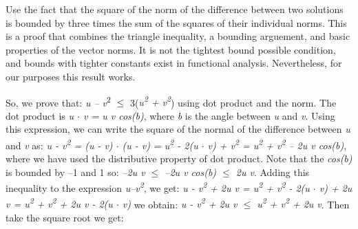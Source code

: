 \documentclass[12pt,a4paper]{report}
\numberwithin{equation}{section}
\begin{document}
Use the fact that the square of the norm of the difference between two
solutions is bounded by three times the sum of the squares of their
individual norms. This is a proof that combines the triangle inequality,
a bounding arguement, and basic properties of the vector norms. It is
not the tightest bound possible condition, and bounds with tighter
constants exist in functional analysis. Nevertheless, for our purposes
this result works.

So, we prove that: \textbar\textbar{}\emph{u --
v}\textbar\textbar{}\textsuperscript{2} $\leq$
3(\textbar\textbar{}\emph{u\textbar\textbar{}\textsuperscript{2} +
\textbar\textbar v\textbar\textbar{}\textsuperscript{2}}) using dot
product and the norm. The dot product is \emph{u $\cdot$ v =
\textbar\textbar u\textbar\textbar{}
\textbar\textbar v\textbar\textbar{} cos(b)}, where \emph{b} is the
angle between \emph{u} and \emph{v}. Using this expression, we can write
the square of the normal of the difference between \emph{u} and \emph{v}
as: \emph{\textbar\textbar u - v\textbar\textbar{}\textsuperscript{2} =
(u - v) $\cdot$ (u - v) =
\textbar\textbar u\textbar\textbar{}\textsuperscript{2} - 2(u $\cdot$ v) +
\textbar\textbar v\textbar\textbar{}\textsuperscript{2} =
\textbar\textbar u\textbar\textbar{}\textsuperscript{2} +
\textbar\textbar v\textbar\textbar{}\textsuperscript{2} --
2\textbar\textbar u\textbar\textbar{}
\textbar\textbar v\textbar\textbar{} cos(b)}, where we have used the
distributive property of dot product. Note that the \emph{cos(b)} is
bounded by --1 and 1 so: \emph{--2\textbar\textbar u\textbar\textbar{}
\textbar\textbar v\textbar\textbar{} $\leq$
--2\textbar\textbar u\textbar\textbar{}
\textbar\textbar v\textbar\textbar{} cos(b) $\leq$
2\textbar\textbar u\textbar\textbar{}
\textbar\textbar v\textbar\textbar{}}. Adding this inequality to the
expression
\emph{\textbar\textbar u--v\textbar\textbar{}\textsuperscript{2}}, we
get: \emph{\textbar\textbar u - v\textbar\textbar{}\textsuperscript{2} +
2\textbar\textbar u\textbar\textbar{}
\textbar\textbar v\textbar\textbar{} =
\textbar\textbar u\textbar\textbar{}\textsuperscript{2} +
\textbar\textbar v\textbar\textbar{}\textsuperscript{2} - 2(u $\cdot$ v) +
2\textbar\textbar u\textbar\textbar{}
\textbar\textbar v\textbar\textbar{} =
\textbar\textbar u\textbar\textbar{}\textsuperscript{2}} \emph{+
\textbar\textbar v\textbar\textbar{}\textsuperscript{2} +
2\textbar\textbar u\textbar\textbar{}
\textbar\textbar v\textbar\textbar{} - 2(u $\cdot$ v)} we obtain:
\emph{\textbar\textbar u - v\textbar\textbar{}\textsuperscript{2} +
2\textbar\textbar u\textbar\textbar{}
\textbar\textbar v\textbar\textbar{} $\leq$
\textbar\textbar u\textbar\textbar{}\textsuperscript{2} +
\textbar\textbar v\textbar\textbar{}\textsuperscript{2} +
2\textbar\textbar u\textbar\textbar{}
\textbar\textbar v\textbar\textbar{}}. Then take the square root we get:
\end{document}
